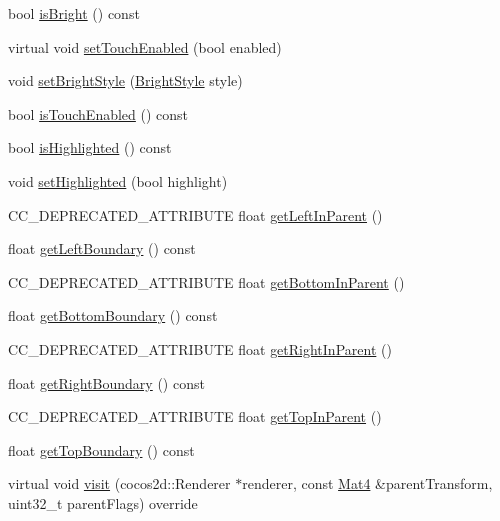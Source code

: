 \begin{DoxyCompactItemize}
\item 
bool \hyperlink{classui_1_1Widget_a7c8b52f349c997848f23896acba7a44f}{is\+Bright} () const
\item 
virtual void \hyperlink{classui_1_1Widget_a2d86c544e0f0d5b8013f4cca88b3f321}{set\+Touch\+Enabled} (bool enabled)
\item 
void \hyperlink{classui_1_1Widget_a9647a3476eaa459a0f70fb91710714f9}{set\+Bright\+Style} (\hyperlink{classui_1_1Widget_a4040e89d49e005b771ac8a80a13206fc}{Bright\+Style} style)
\item 
bool \hyperlink{classui_1_1Widget_aad4e2d18440585570baae60a85d5f97a}{is\+Touch\+Enabled} () const
\item 
bool \hyperlink{classui_1_1Widget_ae95900edba414cdf224bdd528de84091}{is\+Highlighted} () const
\item 
void \hyperlink{classui_1_1Widget_ad18c81cef2447dcfb59b7f4250b0eeeb}{set\+Highlighted} (bool highlight)
\item 
C\+C\+\_\+\+D\+E\+P\+R\+E\+C\+A\+T\+E\+D\+\_\+\+A\+T\+T\+R\+I\+B\+U\+TE float \hyperlink{classui_1_1Widget_a316405b0bce9cb99a3efcef9b9754a86}{get\+Left\+In\+Parent} ()
\item 
float \hyperlink{classui_1_1Widget_a8385fe9b6ee78928d9c585e2faf0bc0d}{get\+Left\+Boundary} () const
\item 
C\+C\+\_\+\+D\+E\+P\+R\+E\+C\+A\+T\+E\+D\+\_\+\+A\+T\+T\+R\+I\+B\+U\+TE float \hyperlink{classui_1_1Widget_a91d67290067178a0a7534edb06756495}{get\+Bottom\+In\+Parent} ()
\item 
float \hyperlink{classui_1_1Widget_a70fffbbaaff8cfcccb305e3b90bb85e6}{get\+Bottom\+Boundary} () const
\item 
C\+C\+\_\+\+D\+E\+P\+R\+E\+C\+A\+T\+E\+D\+\_\+\+A\+T\+T\+R\+I\+B\+U\+TE float \hyperlink{classui_1_1Widget_ad64a744c35c0ee24d1239c02dad5c03c}{get\+Right\+In\+Parent} ()
\item 
float \hyperlink{classui_1_1Widget_aadc5ba521f815795f2648ee356f26d91}{get\+Right\+Boundary} () const
\item 
C\+C\+\_\+\+D\+E\+P\+R\+E\+C\+A\+T\+E\+D\+\_\+\+A\+T\+T\+R\+I\+B\+U\+TE float \hyperlink{classui_1_1Widget_a3a4efd935d1f5e58f1ee1d56dd493607}{get\+Top\+In\+Parent} ()
\item 
float \hyperlink{classui_1_1Widget_a5b155e9c81f0e4fb9c55e4e37e335aa9}{get\+Top\+Boundary} () const
\item 
virtual void \hyperlink{classui_1_1Widget_a83e4156c39e276986f277e6f7659c319}{visit} (cocos2d\+::\+Renderer $\ast$renderer, const \hyperlink{classMat4}{Mat4} \&parent\+Transform, uint32\+\_\+t parent\+Flags) override

\end{DoxyCompactItemize}
